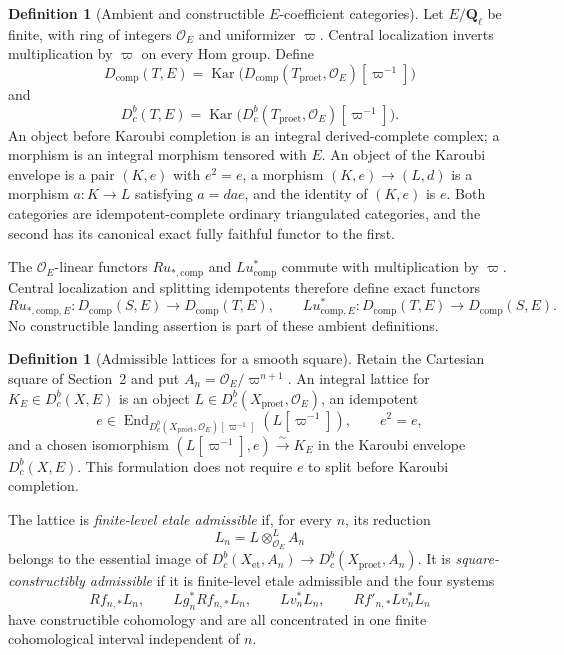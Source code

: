 \documentclass[10pt]{article}
\theoremstyle{definition}
\newtheorem{definition}[theorem]{Definition}
\newcommand{\Ql}{\mathbf Q_\ell}
\newcommand{\Dbc}{D^b_c}
\newcommand{\et}{\mathrm{et}}
\newcommand{\proet}{\mathrm{proet}}
\begin{document}
\begin{definition}[Ambient and constructible $E$-coefficient categories]
Let $E/\Ql$ be finite, with ring of integers $\mathcal O_E$ and uniformizer
$\varpi$.  Central localization inverts multiplication by $\varpi$ on every
Hom group.  Define
\[
 D_{\mathrm{comp}}(T,E)=
 \operatorname{Kar}\bigl(
   D_{\mathrm{comp}}(T_{\proet},\mathcal O_E)[\varpi^{-1}]
 \bigr)
\]
and
\[
 \Dbc(T,E)=
 \operatorname{Kar}\bigl(
   \Dbc(T_{\proet},\mathcal O_E)[\varpi^{-1}]
 \bigr).
\]
An object before Karoubi completion is an integral derived-complete complex;
a morphism is an integral morphism tensored with $E$.  An object of the
Karoubi envelope is a pair $(K,e)$ with $e^2=e$, a morphism
$(K,e)\to(L,d)$ is a morphism $a:K\to L$ satisfying $a=dae$, and the identity
of $(K,e)$ is $e$.  Both categories are idempotent-complete ordinary
triangulated categories, and the second has its canonical exact fully
faithful functor to the first.

The $\mathcal O_E$-linear functors $Ru_{*,\mathrm{comp}}$ and
$Lu^*_{\mathrm{comp}}$ commute with multiplication by $\varpi$.  Central
localization and splitting idempotents therefore define exact functors
\[
 Ru_{*,\mathrm{comp},E}:D_{\mathrm{comp}}(S,E)
       \longrightarrow D_{\mathrm{comp}}(T,E),
 \qquad
 Lu^*_{\mathrm{comp},E}:D_{\mathrm{comp}}(T,E)
       \longrightarrow D_{\mathrm{comp}}(S,E).
\]
No constructible landing assertion is part of these ambient definitions.
\end{definition}

\begin{definition}[Admissible lattices for a smooth square]
Retain the Cartesian square of Section~2 and put
$A_n=\mathcal O_E/\varpi^{n+1}$.  An integral lattice for
$K_E\in\Dbc(X,E)$ is an object
$L\in\Dbc(X_{\proet},\mathcal O_E)$, an idempotent
\[
 e\in\operatorname{End}_{
 \Dbc(X_{\proet},\mathcal O_E)[\varpi^{-1}]}
 (L[\varpi^{-1}]),
 \qquad e^2=e,
\]
and a chosen isomorphism
$(L[\varpi^{-1}],e)\xrightarrow{\sim}K_E$ in the Karoubi envelope
$\Dbc(X,E)$.  This formulation does not require $e$ to split before Karoubi
completion.

The lattice is \emph{finite-level etale admissible} if, for every $n$, its
reduction
\[
 L_n=L\otimes^L_{\mathcal O_E}A_n
\]
belongs to the essential image of
$\Dbc(X_{\et},A_n)\to\Dbc(X_{\proet},A_n)$.  It is
\emph{square-constructibly admissible} if it is finite-level etale
admissible and the four systems
\[
 Rf_{n,*}L_n,\qquad Lg_n^*Rf_{n,*}L_n,\qquad
 Lv_n^*L_n,\qquad Rf'_{n,*}Lv_n^*L_n
\]
have constructible cohomology and are all concentrated in one finite
cohomological interval independent of $n$.
\end{definition}
\end{document}
